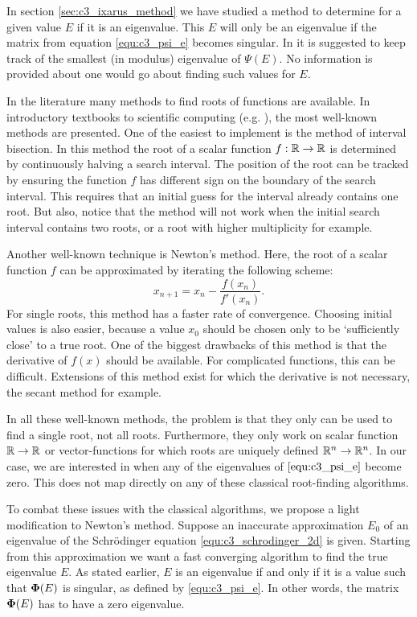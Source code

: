 In section \ref{sec:c3_ixarus_method} we have studied a method to determine for a given value $E$ if it is an eigenvalue. This $E$ will only be an eigenvalue if the matrix from equation \eqref{equ:c3_psi_e} becomes singular. In \cite{ixaru_new_2010} it is suggested to keep track of the smallest (in modulus) eigenvalue of $\Psi(E)$. No information is provided about one would go about finding such values for $E$.

In the literature many methods to find roots of functions are available. In introductory textbooks to scientific computing (e.g. \cite[Chapter~5]{heath_scientific_2002}), the most well-known methods are presented. One of the easiest to implement is the method of interval bisection. In this method the root of a scalar function $f : \mathbb{R} \to \mathbb{R}$ is determined by continuously halving a search interval. The position of the root can be tracked by ensuring the function $f$ has different sign on the boundary of the search interval. This requires that an initial guess for the interval already contains one root. But also, notice that the method will not work when the initial search interval contains two roots, or a root with higher multiplicity for example.

Another well-known technique is Newton's method. Here, the root of a scalar function $f$ can be approximated by iterating the following scheme:
$$
    x_{n+1} = x_n - \frac{f(x_n)}{f'(x_n)}\text{.}
$$
For single roots, this method has a faster rate of convergence. Choosing initial values is also easier, because a value $x_0$ should be chosen only to be `sufficiently close' to a true root. One of the biggest drawbacks of this method is that the derivative of $f(x)$ should be available. For complicated functions, this can be difficult. Extensions of this method exist for which the derivative is not necessary, the secant method for example.

In all these well-known methods, the problem is that they only can be used to find a single root, not all roots. Furthermore, they only work on scalar function $\mathbb{R} \to \mathbb{R}$ or vector-functions for which roots are uniquely defined $\mathbb{R}^n \to \mathbb{R}^n$. In our case, we are interested in when any of the eigenvalues of $\eqref{equ:c3_psi_e}$ become zero. This does not map directly on any of these classical root-finding algorithms.

To combat these issues with the classical algorithms, we propose a light modification to Newton's method. Suppose an inaccurate approximation $E_0$ of an eigenvalue of the Schrödinger equation \eqref{equ:c3_schrodinger_2d} is given. Starting from this approximation we want a fast converging algorithm to find the true eigenvalue $E$. As stated earlier, $E$ is an eigenvalue if and only if it is a value such that $\vb{\Phi}(E)$ is singular, as defined by \eqref{equ:c3_psi_e}. In other words, the matrix $\vb{\Phi}(E)$ has to have a zero eigenvalue.

